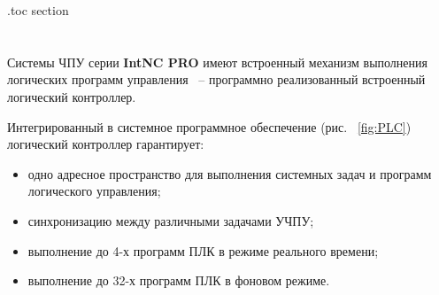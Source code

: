 \etocsettocdepth.toc {section}

\chapter{}
\label{sec:Elements}

\section{}

Системы \mbox{ЧПУ} серии \textbf{IntNC PRO} имеют встроенный механизм выполнения логических программ управления ~-- программно реализованный встроенный логический контроллер.\killoverfullbefore

Интегрированный в системное программное обеспечение (рис. ~\ref{fig:PLC}) логический контроллер гарантирует:
\begin{itemize}
\item одно адресное пространство для выполнения системных задач и программ логического управления;
\item синхронизацию между различными задачами УЧПУ;
\item выполнение до 4-х программ ПЛК в режиме реального времени;
\item выполнение до 32-х программ ПЛК в фоновом режиме. \killoverfullbefore 
\end{itemize}


\begin{comment}
\section{\DbgSecSt{\StPart}{Программы ПЛК реального времени и фонового режима}}
\index{Программы ПЛК реального времени и фонового режима}

Константа ~-- число, символ или строка символов. Константы используются в программе для задания постоянных величин. Различают четыре типа констант: целые, с плавающей точкой, символьные константы и cтроковые литералы.\BL

\index{Элементы языка!Константы!Целые константы}
\mylbl{Целые константы}{IntegerConstant} \BL

Строковые литералы имеют тип массива char, то есть строка ~-- массив элементов типа char. Число элементов массива равно числу символов в строке плюс один для заканчивающего пустого символа. \killoverfullbefore
\end{comment}

